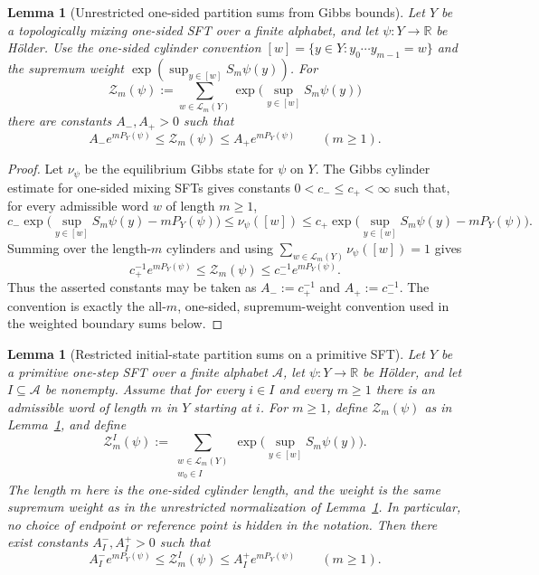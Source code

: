 \documentclass{etds}%
\numberwithin{equation}{section}
\theoremstyle{plain}
\newtheorem{lemma}[theorem]{Lemma}
\theoremstyle{definition}
\theoremstyle{remark}
\begin{document}
\begin{lemma}[Unrestricted one-sided partition sums from Gibbs bounds]
\label{lem:one-sided-gibbs-partition-normalization}
Let $Y$ be a topologically mixing one-sided SFT over a finite alphabet, and let
$\psi:Y\to\mathbb{R}$ be H\"older.  Use the one-sided cylinder convention
$[w]=\{y\in Y:y_0\cdots y_{m-1}=w\}$ and the supremum weight
$\exp(\sup_{y\in[w]}S_m\psi(y))$.  For
\[
\mathcal{Z}_m(\psi)
:=\sum_{w\in\mathcal{L}_m(Y)}
\exp\!\bigl(\sup_{y\in[w]}S_m\psi(y)\bigr)
\]
there are constants $A_-,A_+>0$ such that
\[
A_-e^{mP_Y(\psi)}
\le \mathcal{Z}_m(\psi)
\le A_+e^{mP_Y(\psi)}
\qquad(m\ge 1).
\]
\end{lemma}

\begin{proof}
Let $\nu_\psi$ be the equilibrium Gibbs state for $\psi$ on $Y$.  The Gibbs
cylinder estimate for one-sided mixing SFTs gives constants
$0<c_-\le c_+<\infty$ such that, for every admissible word $w$ of length
$m\ge1$,
\[
c_-\exp\!\bigl(\sup_{y\in[w]}S_m\psi(y)-mP_Y(\psi)\bigr)
\le \nu_\psi([w])
\le c_+\exp\!\bigl(\sup_{y\in[w]}S_m\psi(y)-mP_Y(\psi)\bigr).
\]
Summing over the length-$m$ cylinders and using
$\sum_{w\in\mathcal{L}_m(Y)}\nu_\psi([w])=1$ gives
\[
c_+^{-1}e^{mP_Y(\psi)}
\le \mathcal{Z}_m(\psi)
\le c_-^{-1}e^{mP_Y(\psi)}.
\]
Thus the asserted constants may be taken as $A_-:=c_+^{-1}$ and
$A_+:=c_-^{-1}$.  The convention is exactly the all-$m$, one-sided,
supremum-weight convention used in the weighted boundary sums below.
\end{proof}

\begin{lemma}[Restricted initial-state partition sums on a primitive SFT]
\label{lem:restricted-initial-partition-sum}
Let $Y$ be a primitive one-step SFT over a finite alphabet $\mathcal{A}$, let
$\psi:Y\to\mathbb{R}$ be H\"older, and let $I\subseteq\mathcal{A}$ be nonempty.
Assume that for every $i\in I$ and every $m\ge 1$ there is an admissible word
of length $m$ in $Y$ starting at $i$.
For $m\ge 1$, define $\mathcal{Z}_m(\psi)$ as in
Lemma~\ref{lem:one-sided-gibbs-partition-normalization}, and define
\[
\mathcal{Z}_m^I(\psi)
:=\sum_{\substack{w\in\mathcal{L}_m(Y)\\ w_0\in I}}
\exp\!\bigl(\sup_{y\in[w]}S_m\psi(y)\bigr).
\]
The length $m$ here is the one-sided cylinder length, and the weight is the
same supremum weight as in the unrestricted normalization of
Lemma~\ref{lem:one-sided-gibbs-partition-normalization}.  In particular, no
choice of endpoint or reference point is hidden in the notation.
Then there exist constants $A_I^-,A_I^+>0$ such that
\[
A_I^- e^{mP_Y(\psi)}
\le \mathcal{Z}_m^I(\psi)
\le A_I^+ e^{mP_Y(\psi)}
\qquad(m\ge 1).
\]
\end{lemma}
\end{document}
